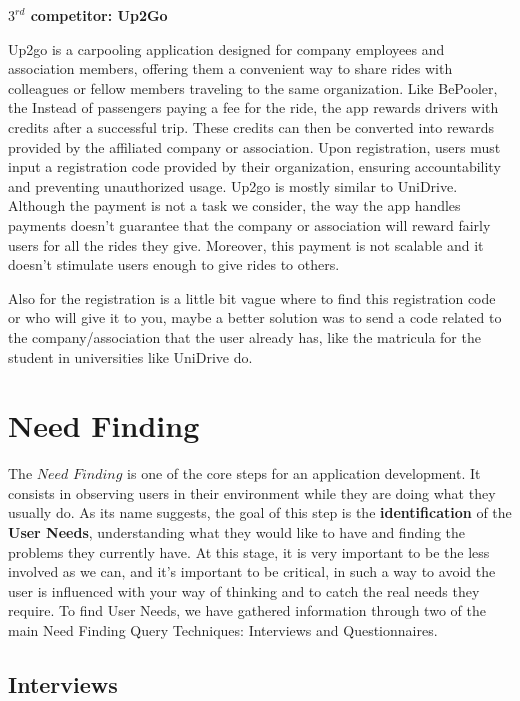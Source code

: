 \documentclass{article}
\begin{document}
\textbf{$3^{rd}$ competitor: Up2Go}
\graphicspath{{Doc images/Competitor Analysis/Up2Go}}

Up2go is a carpooling application designed for company employees and association members, offering them a convenient way to share rides with colleagues or fellow members traveling to the same organization. Like BePooler, the Instead of passengers paying a fee for the ride, the app rewards drivers with credits after a successful trip. These credits can then be converted into rewards provided by the affiliated company or association. Upon registration, users must input a registration code provided by their organization, ensuring accountability and preventing unauthorized usage. Up2go is mostly similar to UniDrive. Although the payment is not a task we consider, the way the app handles payments doesn’t guarantee that the company or association will reward fairly users for all the rides they give. Moreover, this payment is not scalable and it doesn't stimulate users enough to give rides to others.

Also for the registration is a little bit vague where to find this registration code or who will give it to you, maybe a better solution was to send a code related to the company/association that the user already has, like the matricula for the student in universities like UniDrive do.

\section{Need Finding} 
The $\textit{Need Finding}$ is one of the core steps for an application development.  It consists in observing users in their environment while they are doing what they usually do. As its name suggests, the goal of this step is the \textbf{identification} of the \textbf{User Needs}, understanding what they would like to have and finding the problems they currently have. At this stage, it is very important to be the less involved as we can, and it’s important to be critical, in such a way to avoid the user is influenced with your way of thinking and to catch the real needs they require. To find User Needs, we have gathered information through two of the main Need Finding Query Techniques: Interviews and Questionnaires. 

\subsection{Interviews} 
\graphicspath{{Doc images/Need Finding/Interviews}}
\end{document}
